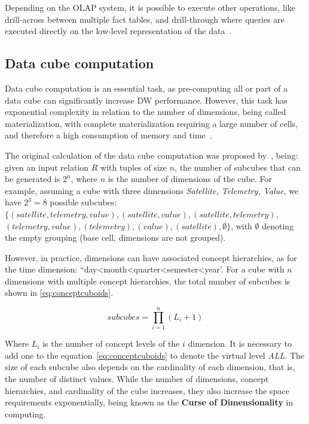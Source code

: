 Depending on the OLAP system, it is possible to execute other operations, like drill-across between multiple fact tables, and drill-through where queries are executed directly on the low-level representation of the data~\cite{hanDataMiningConcepts2011}.

\subsection{Data cube computation}\label{ch:fun:cube:comp}

Data cube computation is an essential task, as pre-computing all or part of a data cube can significantly increase DW performance.
However, this task has exponential complexity in relation to the number of dimensions, being called materialization, with complete materialization requiring a large number of cells, and therefore a high consumption of memory and time~\cite{hanDataMiningConcepts2011}.

The original calculation of the data cube computation was proposed by~, being: given an input relation $R$ with tuples of size $n$, the number of subcubes that can be generated is $2^n$, where $n$ is the number of dimensions of the cube.
For example, assuming a cube with three dimensions \textit{Satellite, Telemetry, Value}, we have $2^3 = 8$ possible subcubes: $\{(satellite, telemetry, value), (satellite, value), (satellite, telemetry),$ $(telemetry, value), (telemetry), (value), (satellite), \emptyset \}$, with $\emptyset$ denoting the empty grouping (base cell, dimensions are not grouped).

However, in practice, dimensions can have associated concept hierarchies, as for the time dimension: ``day<month<quarter<semester<year'.
For a cube with $n$ dimensions with multiple concept hierarchies, the total number of subcubes is shown in \autoref{eq:conceptcuboids}.

\begin{equation}
  subcubes = \prod_{i=1}^n (L_i + 1)
\label{eq:conceptcuboids}
\end{equation}

Where $L_i$ is the number of concept levels of the $i$ dimension.
It is necessary to add one to the equation~\ref{eq:conceptcuboids} to denote the virtual level \textit{ALL}.
The size of each subcube also depends on the cardinality of each dimension, that is, the number of distinct values.
While the number of dimensions, concept hierarchies, and cardinality of the cube increases, they also increase the space requirements exponentially, being known as the \textbf{Curse of Dimensionality} in computing.

